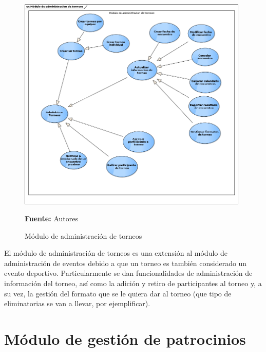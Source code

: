 \begin{figure}[!htb]
  \begin{center}
    \includegraphics[width=11cm]{./imagenes/casos_uso/gestion_torneo.png}
    \caption{Módulo de administración de torneos}
    \label{fig:cu_admin_torn}
    \textbf{Fuente:} Autores \\
  \end{center}
\end{figure}

El módulo de administración de torneos es una extensión al módulo de administración de eventos debido a que un torneo es también considerado un evento deportivo. Particularmente se dan funcionalidades de administración de información del torneo, así como la adición y retiro de participantes al torneo y, a su vez, la gestión del formato que se le quiera dar al torneo (que tipo de eliminatorias se van a llevar, por ejemplificar).

\section{Módulo de gestión de patrocinios}

